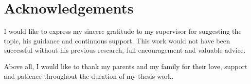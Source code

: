 \chapter*{Acknowledgements}
\thispagestyle{empty}

I would like to express my sincere gratitude to my supervisor \insertsupervisor{} for suggesting the topic, his guidance and continuous support.  This work would not have been successful without his previous research, full encouragement and valuable advice.

Above all, I would like to thank my parents and my family for their love, support and patience throughout the duration of my thesis work.